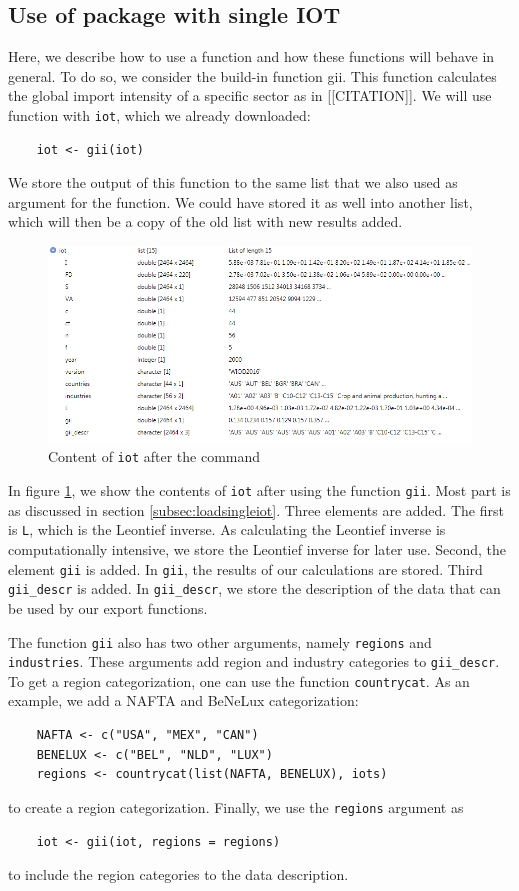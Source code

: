 \documentclass[10pt,a4paper]{paper}
\begin{document}
	\subsection{Use of package with single IOT}
	Here, we describe how to use a function and how these functions will behave in general. To do so, we consider the build-in function gii. This function  calculates the global import intensity of a specific sector as in [[CITATION]]. We will use function with \texttt{iot}, which we already downloaded:
	\begin{Verbatim}
	iot <- gii(iot)
	\end{Verbatim}
	We store the output of this function to the same list that we also used as argument for the function. We could have stored it as well into another list, which will then be a copy of the old list with new results added.
	
	\begin{figure}
	\centering
	\includegraphics[width=1\linewidth]{content_iot_function}
	\caption{Content of \texttt{iot} after the command}
	\label{fig:contentiotfunction}
	\end{figure}

	In figure \ref{fig:contentiotfunction}, we show the contents of \texttt{iot} after using the function \texttt{gii}. Most part is as discussed in section \ref{subsec:loadsingleiot}. Three elements are added. The first is \texttt{L}, which is the Leontief inverse. As calculating the Leontief inverse is computationally intensive, we store the Leontief inverse for later use. Second, the element \texttt{gii} is added. In \texttt{gii}, the results of our calculations are stored. Third \texttt{gii\_descr} is added. In \texttt{gii\_descr}, we store the description of the data that can be used by our export functions.
	
	The function \texttt{gii} also has two other arguments, namely \texttt{regions} and \texttt{industries}. These arguments add region and industry categories to \texttt{gii\_descr}. To get a region categorization, one can use the function \texttt{countrycat}. As an example, we add a NAFTA and BeNeLux categorization:
	\begin{Verbatim}
	NAFTA <- c("USA", "MEX", "CAN")
	BENELUX <- c("BEL", "NLD", "LUX") 
	regions <- countrycat(list(NAFTA, BENELUX), iots)
	\end{Verbatim} 
	to create a region categorization. Finally, we use the \texttt{regions} argument as
	\begin{Verbatim}
	iot <- gii(iot, regions = regions)
	\end{Verbatim}
	to include the region categories to the data description.
	
\end{document}
